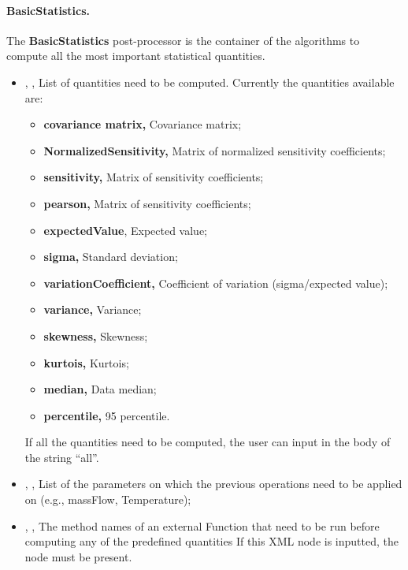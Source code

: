 \paragraph{BasicStatistics.}
\label{BasicStatistics}
The \textbf{BasicStatistics} post-processor is the container of the algorithms
to compute all the most important statistical quantities.
%
\begin{itemize}
  \item {}, ,
  List of quantities need to be computed.
  Currently the quantities available are:
\begin{itemize}
    \item \textbf{covariance matrix,} Covariance matrix;
    \item \textbf{NormalizedSensitivity,} Matrix of normalized sensitivity
    coefficients;
    \item \textbf{sensitivity,} Matrix of sensitivity coefficients;
    \item \textbf{pearson,} Matrix of sensitivity coefficients;
    \item \textbf{expectedValue}, Expected value;
    \item \textbf{sigma,} Standard deviation;
    \item \textbf{variationCoefficient,} Coefficient of variation
    (sigma/expected value);
    \item \textbf{variance,} Variance;
    \item \textbf{skewness,} Skewness;
    \item \textbf{kurtois,} Kurtois;
    \item \textbf{median,} Data median;
    \item \textbf{percentile,} 95 percentile.
\end{itemize}
  If all the quantities need to be computed, the user can input in the body of
   the string ``all''.
  \item {}, ,
  List of the parameters on which the previous operations need to be applied on
  (e.g., massFlow, Temperature);
  \item {}, ,
  The method names of an external Function that need to be run before computing
  any of the predefined quantities If this XML node is inputted, the
   node must be present.

\end{itemize}
